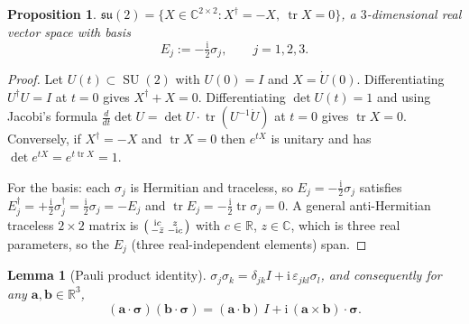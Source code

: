 \documentclass[11pt]{article}
\DeclareMathOperator{\tr}{tr}
\DeclareMathOperator{\SU}{SU}
\newcommand{\su}{\mathfrak{su}}
\newcommand{\R}{\mathbb{R}}
\newcommand{\C}{\mathbb{C}}
\newcommand{\vv}[1]{\bm{#1}}
\newcommand{\ii}{\mathrm{i}}
\theoremstyle{plain}
\newtheorem{proposition}[theorem]{Proposition}
\newtheorem{lemma}[theorem]{Lemma}
\theoremstyle{definition}
\begin{document}
\begin{proposition}\label{prop:su2alg}
$\su(2)=\{X\in\C^{2\times2}: X^{\dagger}=-X,\ \tr X=0\}$, a $3$-dimensional \emph{real} vector
space with basis
\[
E_j:=-\tfrac{\ii}{2}\sigma_j,\qquad j=1,2,3 .
\]
\end{proposition}

\begin{proof}
Let $U(t)\subset\SU(2)$ with $U(0)=I$ and $X=\dot U(0)$. Differentiating $U^{\dagger}U=I$ at $t=0$
gives $X^{\dagger}+X=0$. Differentiating $\det U(t)=1$ and using Jacobi's formula
$\frac{d}{dt}\det U=\det U\cdot\tr(U^{-1}\dot U)$ at $t=0$ gives $\tr X=0$. Conversely, if
$X^\dagger=-X$ and $\tr X=0$ then $e^{tX}$ is unitary and has $\det e^{tX}=e^{t\tr X}=1$.

For the basis: each $\sigma_j$ is Hermitian and traceless, so $E_j=-\tfrac{\ii}{2}\sigma_j$
satisfies $E_j^{\dagger}=+\tfrac{\ii}{2}\sigma_j^{\dagger}=\tfrac{\ii}{2}\sigma_j=-E_j$ and
$\tr E_j=-\tfrac{\ii}{2}\tr\sigma_j=0$. A general anti-Hermitian traceless $2\times2$ matrix is
$\begin{psmallmatrix}\ii c& z\\ -\bar z& -\ii c\end{psmallmatrix}$ with $c\in\R$, $z\in\C$, which
is three real parameters, so the $E_j$ (three real-independent elements) span.
\end{proof}

\begin{lemma}[Pauli product identity]\label{lem:pauli}
$\sigma_j\sigma_k=\delta_{jk}I+\ii\,\varepsilon_{jkl}\sigma_l$, and consequently for any
$\vv a,\vv b\in\R^3$,
\[
(\vv a\cdot\vv\sigma)(\vv b\cdot\vv\sigma)=(\vv a\cdot\vv b)\,I+\ii\,(\vv a\times\vv b)\cdot\vv\sigma .
\]
\end{lemma}
\end{document}
